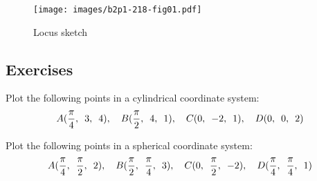 \documentclass[11pt]{amsbook}
\begin{document}
\begin{figure}[htbp]
        \centering
            \centering
            \texttt{[image: images/b2p1-218-fig01.pdf]}
	        \caption{Locus sketch}
        	\label{fig:LocusSketch}
    \end{figure}   

\subsection{Exercises}

\begin{exercise}
    Plot the following points in a cylindrical coordinate system:
    \[
    A(\frac{\pi}{4}, \enskip3, \enskip4), \quad B(\frac{\pi}{2},\enskip 4,\enskip 1), \quad C(0,\enskip -2, \enskip1), \quad D(0, \enskip0,\enskip 2)
    \]
\end{exercise}
\begin{exercise}
    Plot the following points in a spherical coordinate system:
    \[
    A(\frac{\pi}{4}, \enskip\frac{\pi}{2}, \enskip2), \quad B(\frac{\pi}{2},\enskip \frac{\pi}{4},\enskip 3), \quad C(0,\enskip \frac{\pi}{2}, \enskip-2), \quad D(\frac{\pi}{4}, \enskip\frac{\pi}{4},\enskip 1)
    \]
\end{exercise}
\end{document}
